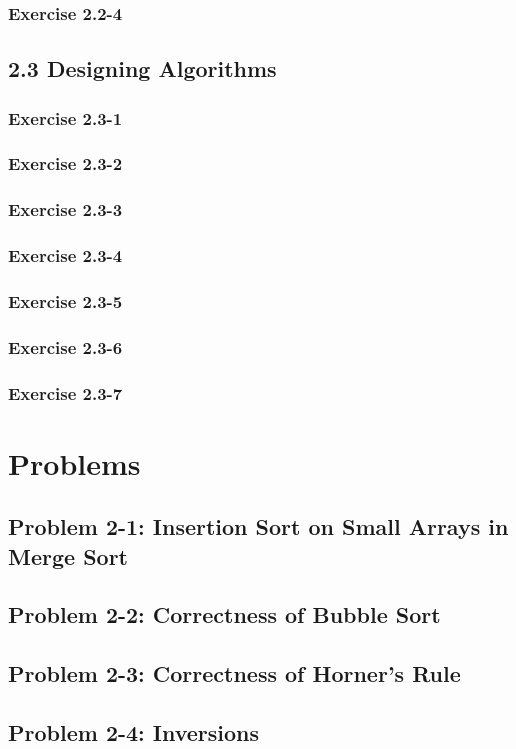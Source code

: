 \documentclass{article}
\begin{document}
\subsubsection*{Exercise 2.2-4}

\subsection*{2.3 Designing Algorithms}
\subsubsection*{Exercise 2.3-1}

\subsubsection*{Exercise 2.3-2}

\subsubsection*{Exercise 2.3-3}

\subsubsection*{Exercise 2.3-4}

\subsubsection*{Exercise 2.3-5}

\subsubsection*{Exercise 2.3-6}

\subsubsection*{Exercise 2.3-7}


\section*{Problems}
\subsection*{Problem 2-1: Insertion Sort on Small Arrays in Merge Sort}

\subsection*{Problem 2-2: Correctness of Bubble Sort}

\subsection*{Problem 2-3: Correctness of Horner's Rule}

\subsection*{Problem 2-4: Inversions}
\end{document}
